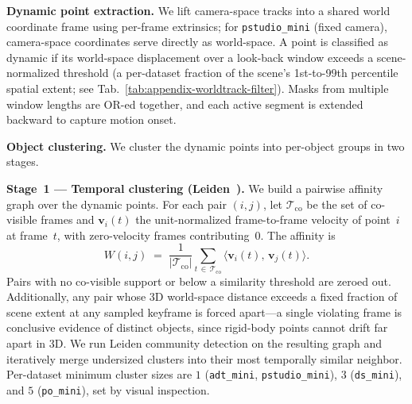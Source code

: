 \documentclass{llmxive}
\begin{document}
\begin{table}[!htbp]
  \centering
  \small
  \setlength{\tabcolsep}{4pt}
  \vspace{2mm}
  \caption{Per-dataset motion-filter settings for dynamic point extraction of WorldTrack data.}
  \label{tab:appendix-worldtrack-filter}
\end{table}

\noindent\textbf{Dynamic point extraction.}
We lift camera-space tracks into a shared world coordinate frame using
per-frame extrinsics; for \texttt{pstudio\_mini} (fixed camera), camera-space
coordinates serve directly as world-space. A point is classified as dynamic if
its world-space displacement over a look-back window exceeds a
scene-normalized threshold (a per-dataset fraction of the scene's
1st-to-99th percentile spatial extent; see
Tab.~\ref{tab:appendix-worldtrack-filter}). Masks from multiple window
lengths are OR-ed together, and each active segment is extended backward to
capture motion onset.

\noindent\textbf{Object clustering.}
We cluster the dynamic points into per-object groups in two stages.

\noindent\textbf{Stage~1 --- Temporal clustering (Leiden~\cite{traag2019leiden}).}
We build a pairwise affinity graph over the dynamic points. For each pair
$(i,j)$, let $\mathcal{T}_\text{co}$ be the set of co-visible frames and
$\mathbf{v}_i(t)$ the unit-normalized frame-to-frame velocity of point~$i$
at frame~$t$, with zero-velocity frames contributing~$0$. The affinity is
\[
  W(i,j) \;=\; \frac{1}{|\mathcal{T}_\text{co}|}
    \sum_{t\,\in\,\mathcal{T}_\text{co}}
    \langle\mathbf{v}_i(t),\,\mathbf{v}_j(t)\rangle.
\]
Pairs with no co-visible support or below a similarity threshold are zeroed
out. Additionally, any pair whose 3D world-space distance exceeds a fixed
fraction of scene extent at any sampled keyframe is forced apart---a single
violating frame is conclusive evidence of distinct objects, since rigid-body
points cannot drift far apart in 3D. We run Leiden community detection on the
resulting graph and iteratively merge undersized clusters into their most
temporally similar neighbor. Per-dataset minimum cluster sizes are $1$
(\texttt{adt\_mini}, \texttt{pstudio\_mini}), $3$ (\texttt{ds\_mini}), and
$5$ (\texttt{po\_mini}), set by visual inspection.
\end{document}
